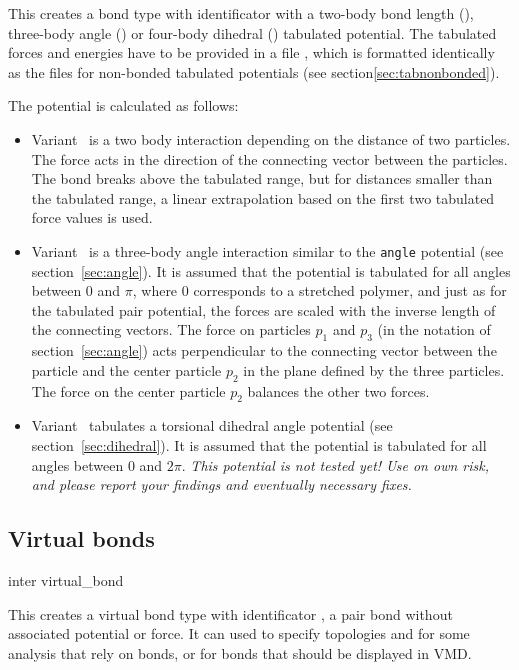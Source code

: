 This creates a bond type with identificator  with a
two-body bond length (), three-body angle () or four-body
dihedral () tabulated potential. The tabulated forces and energies
have to be provided in a file , which is formatted identically as
the files for non-bonded tabulated potentials (see
section\ref{sec:tabnonbonded}).

The potential is calculated as follows:
\begin{itemize}
\item Variant~ is a two body interaction depending on the distance of
  two particles. The force acts in the direction of the connecting vector
  between the particles. The bond breaks above the tabulated range, but for
  distances smaller than the tabulated range, a linear extrapolation based on
  the first two tabulated force values is used.
\item Variant~ is a three-body angle interaction similar to the
  \texttt{angle} potential (see section~\ref{sec:angle}).  It is assumed that
  the potential is tabulated for all angles between 0 and $ \pi $, where 0
  corresponds to a stretched polymer, and just as for the tabulated pair
  potential, the forces are scaled with the inverse length of the connecting
  vectors. The force on particles $p_1$ and $p_3$ (in the notation of
  section~\ref{sec:angle}) acts perpendicular to the connecting vector between
  the particle and the center particle $p_2$ in the plane defined by the three
  particles. The force on the center particle $p_2$ balances the other two
  forces.
\item Variant~ tabulates a torsional dihedral angle potential (see
  section~\ref{sec:dihedral}). It is assumed that the potential is tabulated for
  all angles between 0 and $2\pi$. \em{This potential is not tested yet! Use on
    own risk, and please report your findings and eventually necessary fixes.}
\end{itemize}

\subsection{Virtual bonds}

\begin{essyntax}
  inter  virtual_bond
\end{essyntax}

This creates a virtual bond type with identificator , \ie
a pair bond without associated potential or force. It can used to specify
topologies and for some analysis that rely on bonds, or \eg for bonds that
should be displayed in VMD.


